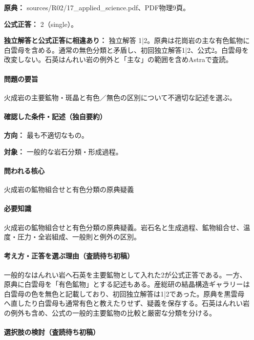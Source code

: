 \noindent\textbf{原典：} sources/R02/17\_applied\_science.pdf、PDF物理9頁。

\textbf{公式正答：} 2（single）。

\par\textbf{独立解答と公式正答に相違あり：} 独立解答 1|2。原典は花崗岩の主な有色鉱物に白雲母を含める。通常の無色分類と矛盾し、初回独立解答1|2、公式2。白雲母を改変しない。石英はんれい岩の例外と「主な」の範囲を含めAstraで査読。

\paragraph{問題の要旨} 火成岩の主要鉱物・斑晶と有色／無色の区別について不適切な記述を選ぶ。

\paragraph{確認した条件・記述（独自要約）}\mbox{}\par

\noindent\textbf{方向：} 最も不適切なもの。\par

\noindent\textbf{対象：} 一般的な岩石分類・形成過程。\par

\paragraph{問われる核心} 火成岩の鉱物組合せと有色分類の原典疑義

\paragraph{必要知識} 火成岩の鉱物組合せと有色分類の原典疑義。岩石名と生成過程、鉱物組合せ、温度・圧力・全岩組成、一般則と例外の区別。

\paragraph{考え方・正答を選ぶ理由（査読待ち初稿）} 一般的なはんれい岩へ石英を主要鉱物として入れた2が公式正答である。一方、原典に白雲母を「有色鉱物」とする記述もある。産総研の結晶構造ギャラリーは白雲母の色を無色と記載しており、初回独立解答は1|2であった。原典を黒雲母へ直したり白雲母も通常有色と教えたりせず、疑義を保存する。石英はんれい岩の例外も含め、公式の一般的主要鉱物の比較と厳密な分類を分ける。

\paragraph{選択肢の検討（査読待ち初稿）}\mbox{}\par

